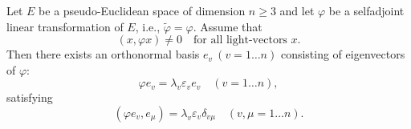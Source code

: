 Let $E$ be a pseudo-Euclidean space of dimension $n \geq 3$ and let $\varphi$ be a selfadjoint linear transformation of $E$, i.e., $\tilde{\varphi} = \varphi$. Assume that
$$(x, \varphi x) \neq 0 \quad \text{for all light-vectors } x.$$
Then there exists an orthonormal basis $e_v\ (v = 1 \ldots n)$ consisting of eigenvectors of $\varphi$:
$$\varphi e_v = \lambda_v \varepsilon_v e_v \quad (v = 1 \ldots n),$$
satisfying
$$(\varphi e_v, e_\mu) = \lambda_v \varepsilon_v \delta_{v\mu} \quad (v, \mu = 1 \ldots n).$$
